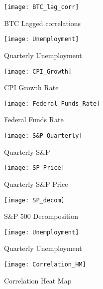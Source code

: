 \documentclass{beamer}
\begin{document}
	
	       
        \begin{frame}
	\begin{figure}
			\texttt{[image: BTC\_lag\_corr]}
			\caption{BTC Lagged correlations}
			\label{fig:BTCcorr}
		\end{figure}
	\end{frame}
	\begin{frame}
	\begin{figure}
			\texttt{[image: Unemployment]}
			\caption{Quarterly Unemployment}
			\label{fig:Unemp}
		\end{figure}
	\end{frame}
	\begin{frame}
	\begin{figure}
			\texttt{[image: CPI\_Growth]}
			\caption{CPI Growth Rate}
			\label{fig:Inf}
		\end{figure}
	\end{frame}
	\begin{frame}
	\begin{figure}
			\texttt{[image: Federal\_Funds\_Rate]}
			\caption{Federal Funds Rate}
			\label{fig:FED}
		\end{figure}
	\end{frame}
	\begin{frame}
	\begin{figure}
			\texttt{[image: S\&P\_Quarterly]}
			\caption{Quarterly S\&P}
			\label{fig:sP}
		\end{figure}
	\end{frame}
	\begin{frame}
	\begin{figure}
			\texttt{[image: SP\_Price]}
			\caption{Quarterly S\&P Price}
			\label{fig:sPP}
		\end{figure}
	\end{frame}
		\begin{frame}
	\begin{figure}
			\texttt{[image: SP\_decom]}
			\caption{S\&P 500 Decomposition }
			\label{fig:sPPP}
		\end{figure}
	\end{frame}

	
	\begin{frame}
	\begin{figure}
			\texttt{[image: Unemployment]}
			\caption{Quarterly Unemployment}
			\label{fig:Unemp}
		\end{figure}
	\end{frame}
         \begin{frame}
	\begin{figure}
			\texttt{[image: Correlation\_HM]}
			\caption{Correlation Heat Map}
			\label{fig:Correlation All}
		\end{figure}
	\end{frame}
\end{document}
